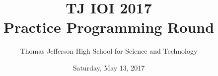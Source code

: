 \documentclass[twoside]{article}
\begin{document}
\title{
    {\Huge TJ IOI 2017}\\
    {\huge Practice Programming Round}
}

\author{
	\large
	Thomas Jefferson High School for Science and Technology
}
\date{\large Saturday, May 13, 2017}


\begin{titlepage}
    \maketitle
\end{titlepage}

\blankpage



\newpage

\tableofcontents
\newpage






\cleardoublepage



\cleardoublepage



\cleardoublepage
\end{document}
